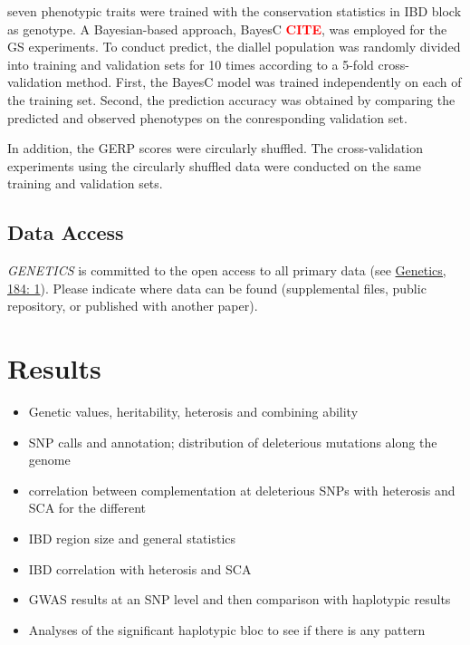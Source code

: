 \documentclass[9pt,twocolumn,twoside]{gsajnl}
\newcommand{\sme}[1]{\textcolor{red}{\bf #1}}
\begin{document}
seven phenotypic traits were trained with the conservation statistics in IBD block as genotype.
A Bayesian-based approach, BayesC \sme{CITE}, was employed for the GS experiments. To conduct predict, the diallel population was randomly divided into training and validation sets for 10 times according to a 5-fold cross-validation method. First, the BayesC model was trained independently on each of the training set. Second, the prediction accuracy was obtained by comparing the predicted and observed phenotypes on the conresponding validation set. 

In addition, the GERP scores were circularly shuffled. The cross-validation experiments using the circularly shuffled data were conducted on the same training and validation sets.  

\subsection*{Data Access}

\textit{GENETICS} is committed to the open access to all primary data (see \href{http://www.genetics.org/content/184/1/1.full}{Genetics, 184: 1}). Please indicate where data can be found (supplemental files, public repository, or published with another paper).



\section*{Results}

\begin{itemize}
  \item Genetic values, heritability, heterosis and combining ability 
  \item SNP calls and annotation; distribution of deleterious mutations along the genome 
  \item correlation between complementation at deleterious SNPs with heterosis and SCA for the different 
  \item IBD region size and general statistics 
  \item IBD correlation with heterosis and SCA
  \item GWAS results at an SNP level and then comparison with haplotypic results 
  \item Analyses of the significant haplotypic bloc to see if there is any pattern
\end{itemize}
\end{document}
